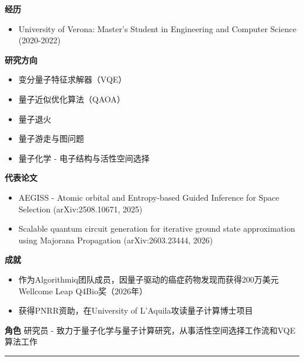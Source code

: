 \par{\footnotesize\color{mainred}\textbf{经历}}
\begin{itemize}[leftmargin=1.2em,itemsep=0pt,topsep=0pt]
\item {\footnotesize University of Verona: Master's Student in Engineering and Computer Science (2020-2022)}
\end{itemize}
\par{\footnotesize\color{mainred}\textbf{研究方向}}
\begin{itemize}[leftmargin=1.2em,itemsep=0pt,topsep=0pt]
\item {\footnotesize 变分量子特征求解器（VQE）}
\item {\footnotesize 量子近似优化算法（QAOA）}
\item {\footnotesize 量子退火}
\item {\footnotesize 量子游走与图问题}
\item {\footnotesize 量子化学 - 电子结构与活性空间选择}
\end{itemize}
\par{\footnotesize\color{mainred}\textbf{代表论文}}
\begin{itemize}[leftmargin=1.2em,itemsep=0pt,topsep=0pt]
\item {\footnotesize AEGISS - Atomic orbital and Entropy-based Guided Inference for Space Selection (arXiv:2508.10671, 2025)}
\item {\footnotesize Scalable quantum circuit generation for iterative ground state approximation using Majorana Propagation (arXiv:2603.23444, 2026)}
\end{itemize}
\par{\footnotesize\color{mainred}\textbf{成就}}
\begin{itemize}[leftmargin=1.2em,itemsep=0pt,topsep=0pt]
\item {\footnotesize 作为Algorithmiq团队成员，因量子驱动的癌症药物发现而获得200万美元Wellcome Leap Q4Bio奖（2026年）}
\item {\footnotesize 获得PNRR资助，在University of L'Aquila攻读量子计算博士项目}
\end{itemize}
\par{\footnotesize\color{mainred}\textbf{角色}} {\footnotesize 研究员 - 致力于量子化学与量子计算研究，从事活性空间选择工作流和VQE算法工作}
\vspace{2pt}\hrule\vspace{2pt}
